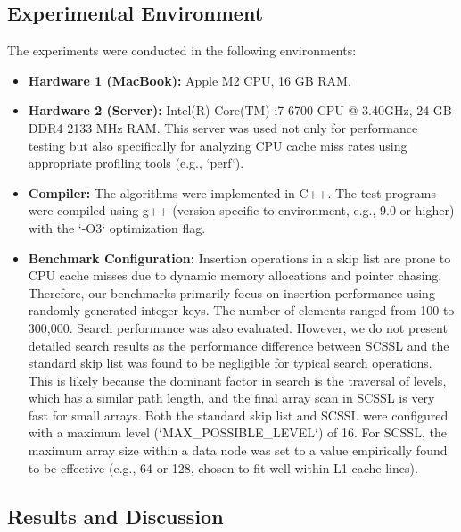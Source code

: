 \documentclass{article}
\begin{document}
\subsection{Experimental Environment}
The experiments were conducted in the following environments:
\begin{itemize}
    \item \textbf{Hardware 1 (MacBook):} Apple M2 CPU, 16 GB RAM.
    \item \textbf{Hardware 2 (Server):} Intel(R) Core(TM) i7-6700 CPU @ 3.40GHz, 24 GB DDR4 2133 MHz RAM. This server was used not only for performance testing but also specifically for analyzing CPU cache miss rates using appropriate profiling tools (e.g., `perf`).
    \item \textbf{Compiler:} The algorithms were implemented in C++. The test programs were compiled using g++ (version specific to environment, e.g., 9.0 or higher) with the `-O3` optimization flag.
    \item \textbf{Benchmark Configuration:}
        Insertion operations in a skip list are prone to CPU cache misses due to dynamic memory allocations and pointer chasing. Therefore, our benchmarks primarily focus on insertion performance using randomly generated integer keys. The number of elements ranged from 100 to 300,000.
        Search performance was also evaluated. However, we do not present detailed search results as the performance difference between SCSSL and the standard skip list was found to be negligible for typical search operations. This is likely because the dominant factor in search is the traversal of levels, which has a similar path length, and the final array scan in SCSSL is very fast for small arrays.
        Both the standard skip list and SCSSL were configured with a maximum level (`MAX_POSSIBLE_LEVEL`) of 16. For SCSSL, the maximum array size within a data node was set to a value empirically found to be effective (e.g., 64 or 128, chosen to fit well within L1 cache lines).
\end{itemize}

\subsection{Results and Discussion}
\end{document}
